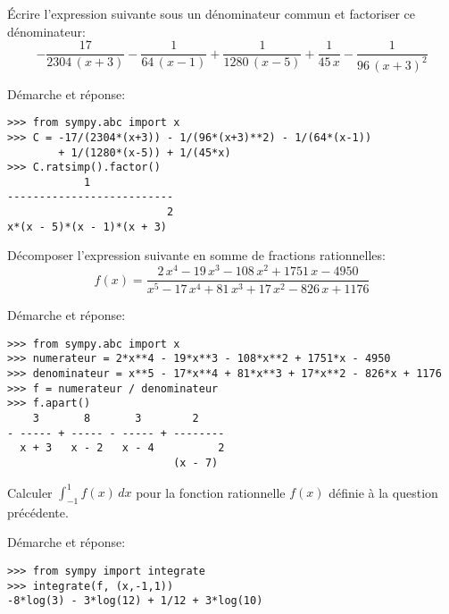 \begin{question}[1 pts]
    Écrire l'expression suivante sous un dénominateur commun et factoriser ce
    dénominateur:
\[
-\frac{17}{2304 \, {\left(x + 3\right)}} - \frac{1}{64 \, {\left(x - 1\right)}}
+ \frac{1}{1280 \, {\left(x - 5\right)}} + \frac{1}{45 \, x} - \frac{1}{96 \,
{\left(x + 3\right)}^{2}}
\]
\begin{mybox}
Démarche et réponse:
\begin{reponse}
\begin{verbatim}
>>> from sympy.abc import x
>>> C = -17/(2304*(x+3)) - 1/(96*(x+3)**2) - 1/(64*(x-1)) 
        + 1/(1280*(x-5)) + 1/(45*x)
>>> C.ratsimp().factor()
            1
--------------------------
                         2
x*(x - 5)*(x - 1)*(x + 3)
\end{verbatim}
\end{reponse}
\end{mybox}
\end{question}



\begin{question}[1 pts]
    Décomposer l'expression suivante en somme de fractions rationnelles:
    \[
	f(x) = \frac{2 \, x^{4} - 19 \, x^{3} - 108 \, x^{2} + 1751 \, x - 4950}
	{x^{5} - 17 \, x^{4} + 81 \, x^{3} + 17 \, x^{2} - 826 \, x + 1176}
    \]
\begin{mybox}
Démarche et réponse:
\begin{reponse}
\begin{verbatim}
>>> from sympy.abc import x
>>> numerateur = 2*x**4 - 19*x**3 - 108*x**2 + 1751*x - 4950
>>> denominateur = x**5 - 17*x**4 + 81*x**3 + 17*x**2 - 826*x + 1176
>>> f = numerateur / denominateur
>>> f.apart()
    3       8       3        2
- ----- + ----- - ----- + --------
  x + 3   x - 2   x - 4          2
                          (x - 7)
\end{verbatim}
\end{reponse}
\end{mybox}
\end{question}


\begin{question}[1 pts]
Calculer $\int_{-1}^1 f(x) \,dx$ pour la fonction rationnelle $f(x)$ définie à
la question précédente.
\begin{mybox}
Démarche et réponse:
\begin{reponse}
\begin{verbatim}
>>> from sympy import integrate
>>> integrate(f, (x,-1,1))
-8*log(3) - 3*log(12) + 1/12 + 3*log(10)
\end{verbatim}
\end{reponse}
\end{mybox}
\end{question}


